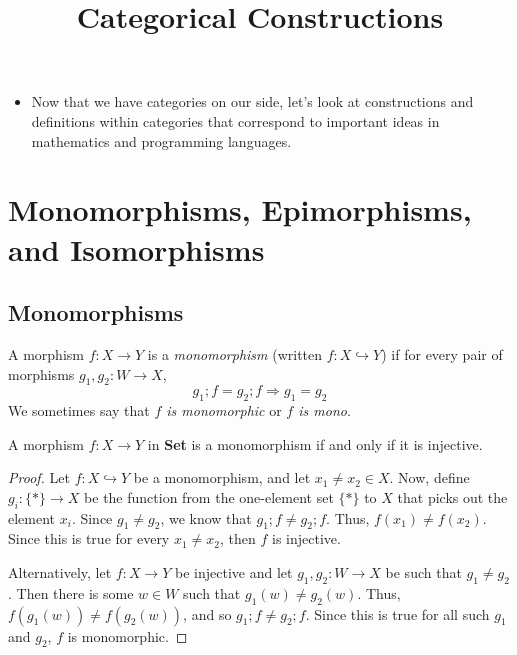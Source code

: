 \documentclass{lecturenotes}
\title{Categorical Constructions}
\newcommand{\Set}{\textbf{Set}\xspace}
\begin{document}
\maketitle

\begin{itemize}
\item Now that we have categories on our side, let's look at constructions and definitions within categories that correspond to important ideas in mathematics and programming languages.
\end{itemize}

\section{Monomorphisms, Epimorphisms, and Isomorphisms}
\label{sec:monom-epim-isom}

\subsection{Monomorphisms}
\label{sec:monomorphisms}

\begin{defn}[Monomorphism]
  A morphism $f : X \to Y$ is a \emph{monomorphism} (written $f : X \hookrightarrow Y$) if for every pair of morphisms $g_1, g_2 : W \to X$, $$g_1; f = g_2; f \Rightarrow g_1 = g_2$$
  We sometimes say that \emph{$f$ is monomorphic} or \emph{$f$ is mono}.
\end{defn}

\begin{thm}[Monomorphisms in \Set]
  A morphism $f : X \to Y$ in \Set is a monomorphism if and only if it is injective.
\end{thm}
\begin{proof}
  Let $f : X \hookrightarrow Y$ be a monomorphism, and let $x_1 \neq x_2 \in X$.
  Now, define $g_i : \{\ast\} \to X$ be the function from the one-element set $\{\ast\}$ to $X$ that picks out the element $x_i$.
  Since $g_1 \neq g_2$, we know that $g_1; f \neq g_2; f$.
  Thus, $f(x_1) \neq f(x_2)$.
  Since this is true for every $x_1 \neq x_2$, then $f$ is injective.

  Alternatively, let $f : X \to Y$ be injective and let $g_1, g_2 : W \to X$ be such that $g_1 \neq g_2$.
  Then there is some $w \in W$ such that $g_1(w) \neq g_2(w)$.
  Thus, $f(g_1(w)) \neq f(g_2(w))$, and so $g_1;f \neq g_2; f$.
  Since this is true for all such $g_1$ and $g_2$, $f$ is monomorphic.
\end{proof}
\end{document}
